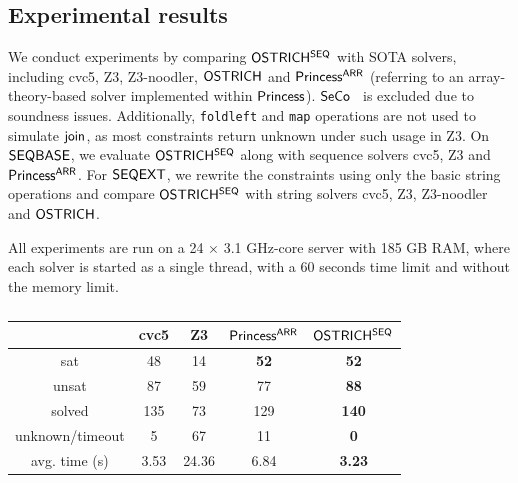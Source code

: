 \subsection{Experimental results}

We conduct experiments by comparing ${\sf OSTRICH^{SEQ}}$ with SOTA solvers, including cvc5, Z3, Z3-noodler, ${\sf OSTRICH}$ and ${\sf Princess^{ARR}}$ (referring to an array-theory-based solver implemented within ${\sf Princess}$). ${\sf SeCo}$~\cite{JezLMR23} is excluded %
due to soundness issues. Additionally, \verb|foldleft| and \verb|map| operations are not used to simulate $\mathsf{join}$, as most constraints return unknown under such usage in Z3.
%
On ${\sf SEQBASE}$, we evaluate ${\sf OSTRICH^{SEQ}}$ along with sequence solvers cvc5, Z3 and ${\sf Princess^{ARR}}$. For ${\sf SEQEXT}$, we rewrite the constraints using only the basic string operations and compare ${\sf OSTRICH^{SEQ}}$ with string solvers cvc5, Z3, Z3-noodler and ${\sf OSTRICH}$.

All experiments are run on a 24 $\times$ 3.1 GHz-core server with 185 GB RAM, where each solver is started as a single thread, with a 60 seconds time limit and without the memory limit.

\begin{table}[t]
\setlength{\tabcolsep}{6pt}
  \centering
    \caption{
  } 
    \begin{tabular}{| c | c | c | c | c |}
      \hline
                      & cvc5        & Z3    & ${\sf Princess^{ARR}}$ & ${\sf OSTRICH^{SEQ}}$ \\
      \hline
      sat             & 48          & 14    & \textbf{52}    & \textbf{52}   \\
      \hline
      unsat           & 87          & 59    & 77             & \textbf{88}   \\
      \hline
      solved          & 135         & 73    & 129            & \textbf{140}  \\
      \hline
      unknown/timeout & 5           & 67    & 11             & \textbf{0}    \\
      \hline
      avg. time (s)   & 3.53        & 24.36 & 6.84           & \textbf{3.23}          \\
      \hline
    \end{tabular} %
  \label{tab:seq-base}
\end{table}


